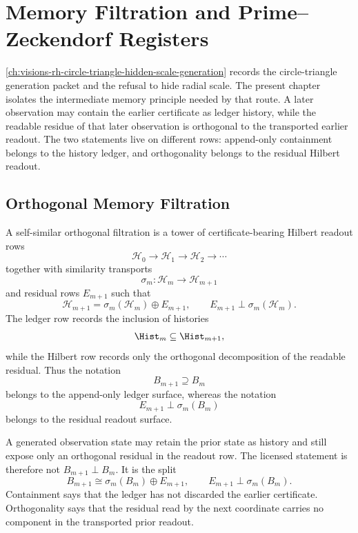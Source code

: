 \chapter{Memory Filtration and Prime--Zeckendorf Registers}
\label{ch:visions-rh-memory-filtration-prime-zeckendorf-register}

\autoref{ch:visions-rh-circle-triangle-hidden-scale-generation} records
the circle-triangle generation packet and the refusal to hide radial
scale. The present chapter isolates the intermediate memory principle
needed by that route. A later observation may contain the earlier
certificate as ledger history, while the readable residue of that later
observation is orthogonal to the transported earlier readout. The two
statements live on different rows: append-only containment belongs to
the history ledger, and orthogonality belongs to the residual Hilbert
readout.

\section{Orthogonal Memory Filtration}
\label{sec:rh-memory-filtration-orthogonal-innovation}

\begin{definition}
\label{def:rh-self-similar-orthogonal-filtration}
A self-similar orthogonal filtration is a tower of certificate-bearing
Hilbert readout rows
$$
\mathcal H_0\longrightarrow \mathcal H_1\longrightarrow
\mathcal H_2\longrightarrow\cdots
$$
together with similarity transports
$$
\sigma_m:\mathcal H_m\to\mathcal H_{m+1}
$$
and residual rows $E_{m+1}$ such that
$$
\mathcal H_{m+1}
=
\sigma_m(\mathcal H_m)\oplus E_{m+1},
\qquad
E_{m+1}\perp\sigma_m(\mathcal H_m).
$$
The ledger row records the inclusion of histories
$$
\Hist_m\subseteq\Hist_{m+1},
$$
while the Hilbert row records only the orthogonal decomposition of the
readable residual. Thus the notation
$$
B_{m+1}\supseteq B_m
$$
belongs to the append-only ledger surface, whereas the notation
$$
E_{m+1}\perp\sigma_m(B_m)
$$
belongs to the residual readout surface.
\end{definition}

\begin{principle}
\label{prin:rh-containment-orthogonality-different-rows}
A generated observation state may retain the prior state as history and
still expose only an orthogonal residual in the readout row. The
licensed statement is therefore not $B_{m+1}\perp B_m$. It is the split
$$
B_{m+1}
\cong
\sigma_m(B_m)\oplus E_{m+1},
\qquad
E_{m+1}\perp\sigma_m(B_m).
$$
Containment says that the ledger has not discarded the earlier
certificate. Orthogonality says that the residual read by the next
coordinate carries no component in the transported prior readout.
\end{principle}

